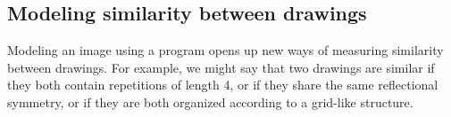 \documentclass{article}
\newcommand{\probability}{\mathds{P}} %
\begin{document}



\subsection{Modeling similarity between drawings}
Modeling an image using a program opens up new ways of measuring similarity between drawings.
For example, we might say that two drawings are similar if they both contain repetitions of length 4,
or if they share the same reflectional symmetry,
or if they are both organized according to a grid-like structure.
\end{document}
